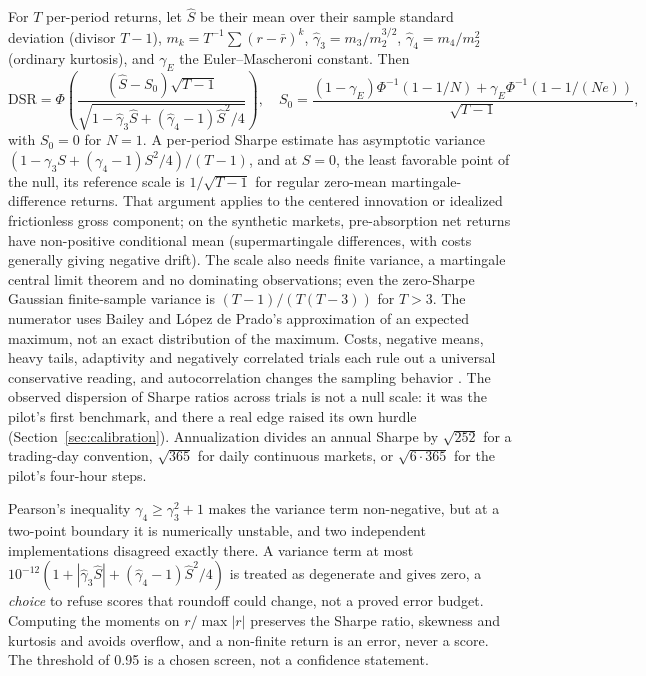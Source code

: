\documentclass[11pt]{article}
\newcommand{\Shat}{\hat{S}}
\begin{document}
For $T$ per-period returns, let $\Shat$ be their mean over their sample standard deviation (divisor $T-1$), $m_k=T^{-1}\sum(r-\bar r)^k$, $\hat\gamma_3=m_3/m_2^{3/2}$, $\hat\gamma_4=m_4/m_2^2$ (ordinary kurtosis), and $\gamma_E$ the Euler--Mascheroni constant. Then
\[
 \mathrm{DSR}=\Phi\left(\frac{(\Shat-S_0)\sqrt{T-1}}
 {\sqrt{1-\hat\gamma_3\Shat+(\hat\gamma_4-1)\Shat^2/4}}\right),\quad
 S_0=\frac{(1-\gamma_E)\Phi^{-1}(1-1/N)+\gamma_E\Phi^{-1}(1-1/(Ne))}{\sqrt{T-1}},
\]
with $S_0=0$ for $N=1$. A per-period Sharpe estimate has asymptotic variance $(1-\gamma_3S+(\gamma_4-1)S^2/4)/(T-1)$, and at $S=0$, the least favorable point of the null, its reference scale is $1/\sqrt{T-1}$ for regular zero-mean martingale-difference returns. That argument applies to the centered innovation or idealized frictionless gross component; on the synthetic markets, pre-absorption net returns have non-positive conditional mean (supermartingale differences, with costs generally giving negative drift). The scale also needs finite variance, a martingale central limit theorem and no dominating observations; even the zero-Sharpe Gaussian finite-sample variance is $(T-1)/(T(T-3))$ for $T>3$. The numerator uses Bailey and L\'opez de Prado's approximation of an expected maximum, not an exact distribution of the maximum. Costs, negative means, heavy tails, adaptivity and negatively correlated trials each rule out a universal conservative reading, and autocorrelation changes the sampling behavior \cite{lo2002}. The observed dispersion of Sharpe ratios across trials is not a null scale: it was the pilot's first benchmark, and there a real edge raised its own hurdle (Section~\ref{sec:calibration}). Annualization divides an annual Sharpe by $\sqrt{252}$ for a trading-day convention, $\sqrt{365}$ for daily continuous markets, or $\sqrt{6\cdot365}$ for the pilot's four-hour steps.

Pearson's inequality $\gamma_4\ge\gamma_3^2+1$ makes the variance term non-negative, but at a two-point boundary it is numerically unstable, and two independent implementations disagreed exactly there. A variance term at most $10^{-12}(1+|\hat\gamma_3\Shat|+(\hat\gamma_4-1)\Shat^2/4)$ is treated as degenerate and gives zero, a \emph{choice} to refuse scores that roundoff could change, not a proved error budget. Computing the moments on $r/\max|r|$ preserves the Sharpe ratio, skewness and kurtosis and avoids overflow, and a non-finite return is an error, never a score. The threshold of 0.95 is a chosen screen, not a confidence statement.
\end{document}
